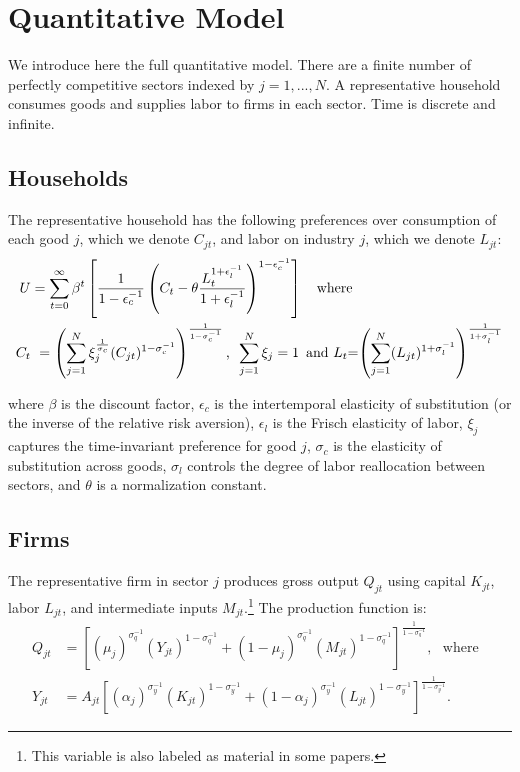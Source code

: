 \section{Quantitative Model \label{sec:Model}}

We introduce here the full quantitative model. There are a finite number of perfectly competitive sectors indexed
by $j={1,...,N}$. A representative household consumes
 goods and supplies labor to firms in each sector. Time is discrete and infinite.

\subsection{Households}

The representative household has the following preferences over consumption
of each good $j$, which we denote $C_{jt}$, and labor on industry
$j$, which we denote $L_{jt}$:
\begin{align*}
U & =\sum_{t=0}^{\infty}\beta^{t}\left[\frac{1}{1-\epsilon_{c}^{-1}}\left(C_{t}-\theta\frac{L_{t}^{1+\epsilon_{l}^{-1}}}{1+\epsilon_{l}^{-1}}\right)^{1-\epsilon_{c}^{-1}}\right]\quad\text{{where}}\\
C_{t} & \text{ }=\left(\sum_{j=1}^{N}\xi_{j}^{\frac{{1}}{\sigma_{c}}}(C_{jt})^{1-\sigma_{c}^{-1}}\right)^{\frac{1}{1-\sigma_{c}^{-1}}}\text{{,}}\enskip\sum_{j=1}^{N}\xi_{j}=1\enskip\text{{and} \ensuremath{L_{t}}=\ensuremath{\left(\sum_{j=1}^{N}(L_{jt})^{1+\sigma_{l}^{-1}}\right)^{\frac{1}{1+\sigma_{l}^{-1}}}}}
\end{align*}

where $\beta$ is the discount factor, $\epsilon_{c}$ is the intertemporal
elasticity of substitution (or the inverse of the relative risk aversion),
$\epsilon_{l}$ is the Frisch elasticity of labor, $\xi_{j}$ captures
the time-invariant preference for good $j$, $\sigma_{c}$ is the
elasticity of substitution across goods, $\sigma_{l}$ controls
the degree of labor reallocation between sectors, and $\theta$ is a normalization constant.%

\subsection{Firms}

The representative firm in sector $j$ produces gross output $Q_{jt}$
using capital $K_{jt}$, labor $L_{jt}$, and intermediate inputs
$M_{jt}$.\footnote{This variable is also labeled as material in some papers. }
The production function is:
\begin{align*}
Q_{jt} & =\left[(\mu_{j})^{\sigma_{q}^{-1}}\left(Y_{jt}\right)^{1-\sigma_{q}^{-1}}+\left(1-\mu_{j}\right)^{\sigma_{q}^{-1}}\left(M_{jt}\right)^{1-\sigma_{q}^{-1}}\right]^{\frac{1}{1-\sigma_{q}^{-1}}},\text{ {where} }\\
Y_{jt} & =A_{jt}\left[(\alpha_{j})^{\sigma_{y}^{-1}}\left(K_{jt}\right)^{1-\sigma_{y}^{-1}}+\left(1-\alpha_{j}\right)^{\sigma_{y}^{-1}}\left(L_{jt}\right)^{1-\sigma_{y}^{-1}}\right]^{\frac{1}{1-\sigma_{y}^{-1}}}.
\end{align*}

